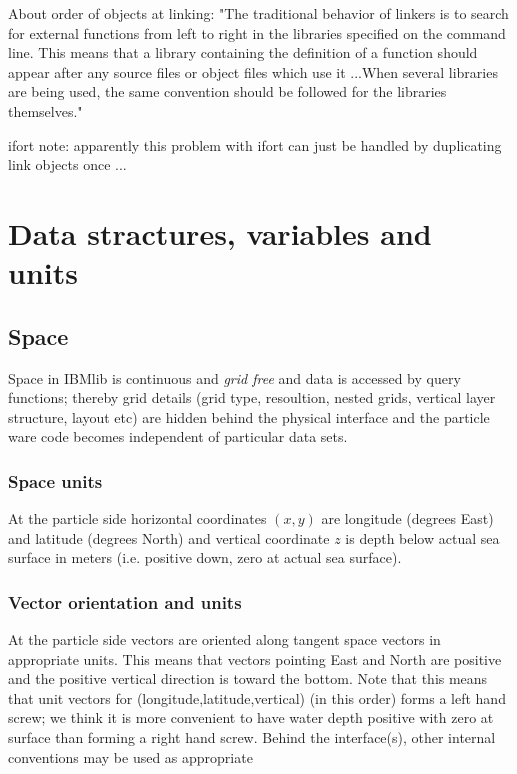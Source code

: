 About order of objects at linking: "The traditional behavior of linkers is to search 
for external functions from left to right in the libraries specified on the command line. 
This means that a library containing the definition of a function should appear after any 
source files or object files which use it ...When several libraries are being used, 
the same convention should be followed for the libraries themselves."

ifort note: apparently this problem with ifort can just be handled
by duplicating link objects once ...


\chapter{Data stractures, variables and units}

\section{Space}
  Space in IBMlib is continuous and {\em grid free} and data
  is accessed by query functions; thereby grid details
  (grid type, resoultion, nested grids, vertical layer structure, layout etc) are
  hidden behind the physical interface and the 
  particle ware code becomes independent of particular 
  data sets.

\subsection{Space units}  \label{Spaceunits}
  At the particle side horizontal coordinates $(x,y)$ are 
  longitude (degrees East) and latitude (degrees North) and
  vertical coordinate $z$ is depth below actual sea surface in meters
  (i.e. positive down, zero at actual sea surface).

\subsection{Vector orientation and units }    \label{Vectororientationandunits}
  At the particle side vectors are oriented along tangent space 
  vectors in appropriate units. This means that vectors pointing East and North
  are positive and the positive vertical direction is toward the bottom. 
  Note that this means that unit vectors for (longitude,latitude,vertical) 
  (in this order) forms a left hand screw; we think it is more convenient
  to have water depth positive with zero at surface than forming a right hand screw.
  Behind the interface(s), other
  internal conventions may be used as appropriate

